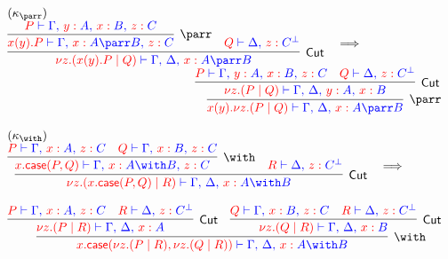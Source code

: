 \begin{figure*}
\[\begin{array}{c}
\\~\\

\multicolumn{1}{l}{(\kappa_{\parr})} \\
\vcenter{
  \inference{
    \inference{
      \tm{P} \tpvdash
        \tp{\Gamma \comma \tmof{y}A \comma \tmof{x}B \comma \tmof{z}C}
    }{\parr}{
      \tm{x(y).P} \tpvdash
        \tp{\Gamma \comma \tmof{x}A \parr B \comma \tmof{z}C}
    }
    &
    \tm{Q} \tpvdash \tp{\Delta \comma \tmof{z}C^\bot}
  }{Cut}{
    \tm{\nu z\Of{C}.(x(y).P \mid Q)} \tpvdash
      \tp{\Gamma \comma \Delta \comma \tmof{x}A \parr B}
  }
}
\quad \becomes \hfill \\
\hfill
\vcenter{
  \inference{
    \inference{
      \tm{P} \tpvdash
        \tp{\Gamma \comma \tmof{y}A \comma \tmof{x}B \comma \tmof{z}C}
      &
      \tm{Q} \tpvdash \tp{\Delta \comma \tmof{z}C^\bot}
    }{Cut}{
      \tm{\nu z\Of{C}.(P \mid Q)} \tpvdash
        \tp{\Gamma \comma \Delta \comma \tmof{y}A \comma \tmof{x}B}
    }
  }{\parr}{
    \tm{x(y).\nu z\Of{C}.(P \mid Q)} \tpvdash
      \tp{\Gamma \comma \Delta \comma \tmof{x}A \parr B}
  }
}

\\~\\

\multicolumn{1}{l}{(\kappa_{\with})} \\
\vcenter{
  \inference{
    \inference{
      \tm{P} \tpvdash \tp{\Gamma \comma \tmof{x}A \comma \tmof{z}C}
      &
      \tm{Q} \tpvdash \tp{\Gamma \comma \tmof{x}B \comma \tmof{z}C}
    }{\with}{
      \tm{x.\caseterm(P,Q)} \tpvdash
        \tp{\Gamma \comma \tmof{x}A \with B \comma \tmof{z}C}
    }
    &
    \tm{R} \tpvdash \tp{\Delta \comma \tmof{z}C^\bot}
  }{Cut}{
    \tm{\nu z\Of{C}.(x.\caseterm(P,Q) \mid R)} \tpvdash
      \tp{\Gamma \comma \Delta \comma \tmof{x}A \with B}
  }
}
\quad \becomes \hfill \\~\\
\hfill
\vcenter{
  \inference{
    \inference{
      \tm{P} \tpvdash \tp{\Gamma \comma \tmof{x}A \comma \tmof{z}C}
      &
      \tm{R} \tpvdash \tp{\Delta \comma \tmof{z}C^\bot}
    }{Cut}{
      \tm{\nu z\Of{C}.(P \mid R)} \tpvdash
        \tp{\Gamma \comma \Delta \comma \tmof{x}A}
    }
    &
    \inference{ 
      \tm{Q} \tpvdash \tp{\Gamma \comma \tmof{x}B \comma \tmof{z}C}
      &
      \tm{R} \tpvdash \tp{\Delta \comma \tmof{z}C^\bot}
    }{Cut}{
      \tm{\nu z\Of{C}.(Q \mid R)} \tpvdash
        \tp{\Gamma \comma \Delta \comma \tmof{x}B}
    }
  }{\with}{
    \tm{x.\caseterm(\nu z\Of{C}.(P \mid R),\nu z\Of{C}.(Q \mid R))} \tpvdash
      \tp{\Gamma \comma \Delta \comma \tmof{x}A \with B}
  }
}


\end{array}\]
\end{figure*}
